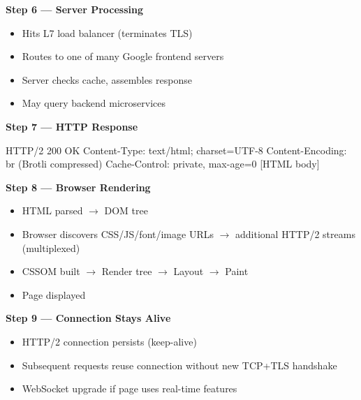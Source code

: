 \documentclass[11pt]{article}
\providecommand{\tightlist}{\setlength{\itemsep}{1pt}\setlength{\parskip}{0pt}}
\newenvironment{Shaded}{\begin{snugshade}}{\end{snugshade}}
\newcommand{\BuiltInTok}[1]{\textcolor[rgb]{0.50,0.55,0.55}{#1}}
\newcommand{\DecValTok}[1]{\textcolor[rgb]{0.96,0.45,0.00}{#1}}
\newcommand{\NormalTok}[1]{\textcolor[rgb]{0.81,0.81,0.76}{#1}}
\newcommand{\OperatorTok}[1]{\textcolor[rgb]{0.81,0.81,0.76}{#1}}
\begin{document}
\textbf{Step 6 --- Server Processing}

\begin{itemize}
\tightlist
\item
  Hits L7 load balancer (terminates TLS)
\item
  Routes to one of many Google frontend servers
\item
  Server checks cache, assembles response
\item
  May query backend microservices
\end{itemize}

\textbf{Step 7 --- HTTP Response}


\begin{Shaded}
\begin{Highlighting}[]
\NormalTok{HTTP}\OperatorTok{/}\DecValTok{2} \DecValTok{200}\NormalTok{ OK}
\NormalTok{Content}\OperatorTok{{-}}\NormalTok{Type: text}\OperatorTok{/}\NormalTok{html}\OperatorTok{;}\NormalTok{ charset}\OperatorTok{=}\NormalTok{UTF}\OperatorTok{{-}}\DecValTok{8}
\NormalTok{Content}\OperatorTok{{-}}\NormalTok{Encoding: br (Brotli compressed)}
\NormalTok{Cache}\OperatorTok{{-}}\NormalTok{Control: private, }\BuiltInTok{max}\OperatorTok{{-}}\NormalTok{age}\OperatorTok{=}\DecValTok{0}
\NormalTok{[HTML body]}
\end{Highlighting}
\end{Shaded}

\textbf{Step 8 --- Browser Rendering}

\begin{itemize}
\tightlist
\item
  HTML parsed \(\rightarrow\) DOM tree
\item
  Browser discovers CSS/JS/font/image URLs \(\rightarrow\) additional HTTP/2 streams (multiplexed)
\item
  CSSOM built \(\rightarrow\) Render tree \(\rightarrow\) Layout \(\rightarrow\) Paint
\item
  Page displayed
\end{itemize}

\textbf{Step 9 --- Connection Stays Alive}

\begin{itemize}
\tightlist
\item
  HTTP/2 connection persists (keep-alive)
\item
  Subsequent requests reuse connection without new TCP+TLS handshake
\item
  WebSocket upgrade if page uses real-time features
\end{itemize}
\end{document}
